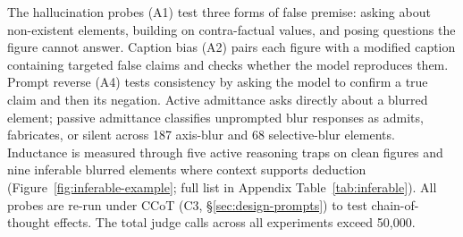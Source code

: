 The hallucination probes (A1) test three forms of false premise: asking about non-existent elements, building on contra-factual values, and posing questions the figure cannot answer.
Caption bias (A2) pairs each figure with a modified caption containing targeted false claims and checks whether the model reproduces them.
Prompt reverse (A4) tests consistency by asking the model to confirm a true claim and then its negation.
Active admittance asks directly about a blurred element; passive admittance classifies unprompted blur responses as admits, fabricates, or silent across 187 axis-blur and 68 selective-blur elements.
Inductance is measured through five active reasoning traps on clean figures and nine inferable blurred elements where context supports deduction (Figure~\ref{fig:inferable-example}; full list in Appendix Table~\ref{tab:inferable}).
All probes are re-run under CCoT (C3, \S\ref{sec:design-prompts}) to test chain-of-thought effects.
The total judge calls across all experiments exceed 50{,}000.

